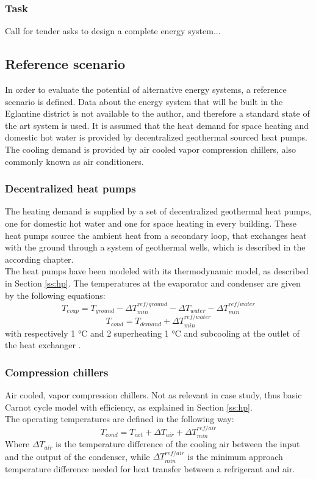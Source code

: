 \documentclass{article}
\begin{document}
\subsubsection{Task}
Call for tender asks to design a complete energy system... 


\subsection{Reference scenario}
In order to evaluate the potential of alternative energy systems, a reference scenario is defined. Data about the energy system that will be built in the Eglantine district is not available to the author, and therefore a standard state of the art system is used. It is assumed that the heat demand for space heating and domestic hot water is provided by decentralized geothermal sourced heat pumps. The cooling demand is provided by air cooled vapor compression chillers, also commonly known as air conditioners.

\subsubsection{Decentralized heat pumps}
The heating demand is supplied by a set of decentralized geothermal heat pumps, one for domestic hot water and one for space heating in every building. These heat pumps source the ambient heat from a secondary loop, that exchanges heat with the ground through a system of geothermal wells, which is described in the according chapter. \\
The heat pumps have been modeled with its thermodynamic model, as described in Section \ref{ss:hp}.
The temperatures at the evaporator and condenser are given by the following equations:
\begin{equation}
    T_{evap} = T_{ground} - \Delta T_{min}^{ref/ground} - \Delta T_{water} - \Delta T_{min}^{ref/water}
\end{equation}
\begin{equation}
    T_{cond} = T_{demand} + \Delta T_{min}^{ref/water}
\end{equation}
with respectively 1 \si{\celsius} and 2 superheating 1 \si{\celsius} and subcooling at the outlet of the heat exchanger \cite{}.

\subsubsection{Compression chillers}
Air cooled, vapor compression chillers. Not as relevant in case study, thus basic Carnot cycle model with efficiency, as explained in Section \ref{ss:hp}.\\
The operating temperatures are defined in the following way:
\begin{equation}
    T_{cond} = T_{ext} + \Delta T_{air} + \Delta T_{min}^{ref/air}
\end{equation}
Where $\Delta T_{air}$ is the temperature difference of the cooling air between the input and the output of the condenser, while $\Delta T_{min}^{ref/air}$ is the minimum approach temperature difference needed for heat transfer between a refrigerant and air.
\end{document}
